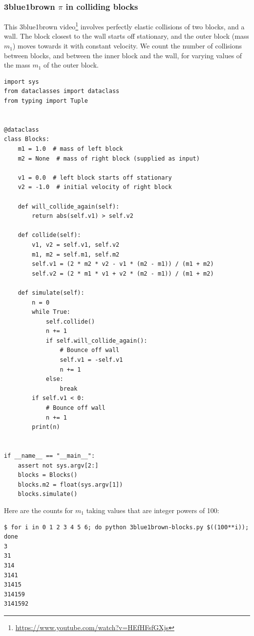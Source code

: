 \newpage
\subsubsection{3blue1brown $\pi$ in colliding blocks}

This 3blue1brown video\footnote{\url{https://www.youtube.com/watch?v=HEfHFsfGXjs}} involves
perfectly elastic collisions of two blocks, and a wall. The block closest to the wall starts off
stationary, and the outer block (mass $m_1$) moves towards it with constant velocity. We count the
number of collisions between blocks, and between the inner block and the wall, for varying values of
the mass $m_1$ of the outer block.

\begin{verbatim}
import sys
from dataclasses import dataclass
from typing import Tuple


@dataclass
class Blocks:
    m1 = 1.0  # mass of left block
    m2 = None  # mass of right block (supplied as input)

    v1 = 0.0  # left block starts off stationary
    v2 = -1.0  # initial velocity of right block

    def will_collide_again(self):
        return abs(self.v1) > self.v2

    def collide(self):
        v1, v2 = self.v1, self.v2
        m1, m2 = self.m1, self.m2
        self.v1 = (2 * m2 * v2 - v1 * (m2 - m1)) / (m1 + m2)
        self.v2 = (2 * m1 * v1 + v2 * (m2 - m1)) / (m1 + m2)

    def simulate(self):
        n = 0
        while True:
            self.collide()
            n += 1
            if self.will_collide_again():
                # Bounce off wall
                self.v1 = -self.v1
                n += 1
            else:
                break
        if self.v1 < 0:
            # Bounce off wall
            n += 1
        print(n)


if __name__ == "__main__":
    assert not sys.argv[2:]
    blocks = Blocks()
    blocks.m2 = float(sys.argv[1])
    blocks.simulate()
\end{verbatim}

Here are the counts for $m_1$ taking values that are integer powers of 100:

\begin{verbatim}
$ for i in 0 1 2 3 4 5 6; do python 3blue1brown-blocks.py $((100**i)); done
3
31
314
3141
31415
314159
3141592
\end{verbatim}

